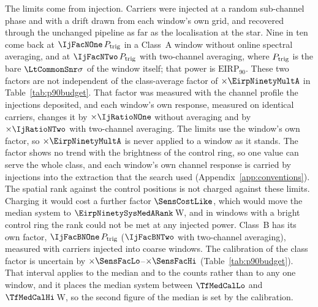 The limits come from injection. Carriers were injected at a random
sub-channel phase and with a drift drawn from each window's own grid, and
recovered through the unchanged pipeline as far as the localisation at the
star. Nine in ten come back at $\IjFacNOne\,P_{\rm trig}$ in a Class~A window
without online spectral averaging, and at $\IjFacNTwo\,P_{\rm trig}$ with
two-channel averaging, where $P_{\rm trig}$ is the bare
$\LtCommonSnr\sigma$ of the window itself; that power is
$\mathrm{EIRP}_{90}$. These two factors are not independent of the
class-average factor of $\times\EirpNinetyMultA$ in Table~\ref{tab:p90budget}.
That factor was measured with the channel profile the injections deposited,
and each window's own response, measured on identical carriers, changes it by
$\times\IjRatioNOne$ without averaging and by $\times\IjRatioNTwo$ with
two-channel averaging. The limits use the window's own factor, so
$\times\EirpNinetyMultA$ is never applied to a window as it stands. The factor shows no trend with the brightness of the
control ring, so one value can serve the whole class, and each window's own
channel response is carried by injections into the extraction that the
search used (Appendix~\ref{app:conventions}). The spatial rank against the
\NCtrl{} control positions is not charged against these limits. Charging it
would cost a further factor $\SensCostLike$, which would move the median
system to $\EirpNinetySysMedARank$\,W, and in \SensNRingHiUnres{}
windows with a bright control ring the rank could not be met at any injected
power. Class~B has its own factor, $\IjFacBNOne\,P_{\rm trig}$
($\IjFacBNTwo$ with two-channel averaging), measured with \SensNToneCoarse{}
carriers injected into \SensNInjCoarse{} coarse windows. The calibration of
the class factor is uncertain by $\times\SensFacLo$--$\times\SensFacHi$
(Table~\ref{tab:p90budget}). That interval applies to the median and to the
counts rather than to any one window, and it places the median system
between $\TfMedCalLo$ and $\TfMedCalHi$\,W, so the second figure of the
median is set by the calibration.

